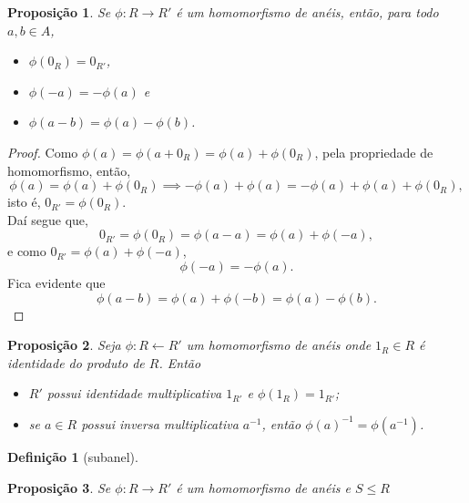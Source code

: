 \documentclass[a4paper,12pt]{article}
\theoremstyle{plain}
\newtheorem{proposicao}{Proposição}[section]
\theoremstyle{definition}
\newtheorem{definicao}{Definição}[section]
\begin{document}
	\begin{proposicao}
		Se $\phi: R \longrightarrow R'$ é um homomorfismo de anéis, então, para todo $a,b\in A$,
		\begin{itemize}
			\item $\phi(0_R) = 0_{R'}$,
			\item $\phi(-a) = -\phi(a)$ e
			\item $\phi(a-b) = \phi(a) - \phi(b)$.
		\end{itemize} 	
	\end{proposicao}
	\begin{proof}
		Como $\phi(a) = \phi(a+0_R) = \phi(a)+\phi(0_R)$, pela propriedade de homomorfismo, então, $$\phi(a) = \phi(a)+\phi(0_R) \implies -\phi(a)+\phi(a) = -\phi(a)+\phi(a)+\phi(0_R),$$ isto é, $0_{R'} = \phi(0_R)$.
	\\
	
		\noindent Daí segue que, $$0_{R'} = \phi(0_R) = \phi(a - a) = \phi(a) + \phi(-a),$$
		e como $0_{R'} = \phi(a) + \phi(-a)$, $$\phi(-a) = -\phi(a).$$
		\noindent Fica evidente que $$\phi(a-b) = \phi(a) + \phi(-b) = \phi(a) - \phi(b).$$
	\end{proof}
	
	\begin{proposicao}
		Seja $\phi:R \longleftarrow	R'$ um homomorfismo de anéis onde $1_R \in R$ é identidade do produto de $R$. Então
		\begin{itemize}
			\item $R'$ possui identidade multiplicativa $1_{R'}$ e $\phi(1_R) = 1_{R'}$;
			\item se $a\in R$ possui inversa multiplicativa $a^{-1}$, então $\phi(a)^{-1} = \phi(a^{-1})$.
		\end{itemize}	
	\end{proposicao}

	\begin{definicao}[subanel]
		
	\end{definicao}
	
	
	\begin{proposicao}
		Se $\phi: R \longrightarrow R'$ é um homomorfismo de anéis e $S\leq R$
	\end{proposicao}
	
	
	
	
	
	
\end{document}
